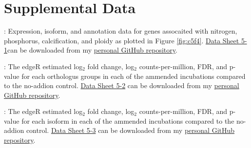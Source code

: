 \begin{landscape}
\begin{table}[h!]
\begin{tabular}{lL{1.25cm}L{2cm}L{2.5cm}L{2cm}L{2cm}L{2cm}L{3cm}L{3cm}}
\end{tabular}
\end{table}
\end{landscape}

\section{Supplemental Data}

    \begin{DS5}
\item \label{DS51}: Expression, isoform, and annotation data for genes assocaited with nitrogen, phosphorus, calcification, and ploidy as plotted in Figure \ref{fig:c5f4}. \href{https://github.com/halexand/MIT\_Latex/blob/master/SupplementalDataSheet\_Chapter5/C5\_DataSheet1\_NutrientGenes.xlsx?raw=true}{Data Sheet 5-1}can be downloaded from my \href{https://github.com/halexand/MIT\_Latex/tree/master/SupplementalDataSheet\_Chapter5}{personal GitHub repository}. 
  
    \item \label{DS52}: The edgeR estimated log$_2$ fold change, log$_2$ counts-per-million, FDR, and p-value for each orthologus groups in each of the ammended incubations compared to the no-addion control.  \href{https://github.com/halexand/MIT\_Latex/blob/master/SupplementalDataSheet\_Chapter5/C5\_DataSheet2\_AllGenes.xlsx?raw=true}{Data Sheet 5-2} can be downloaded from my \href{https://github.com/halexand/MIT\_Latex/tree/master/SupplementalDataSheet\_Chapter5}{personal GitHub repository}. 

    \item \label{DS53}: The edgeR estimated log$_2$ fold change, log$_2$ counts-per-million, FDR, and p-value for each isoform in each of the ammended incubations compared to the no-addion control. \href{https://github.com/halexand/MIT\_Latex/blob/master/SupplementalDataSheet\_Chapter5/C5\_DataSheet3\_AllIsoforms.xlsx?raw=true}{Data Sheet 5-3} can be downloaded from my \href{https://github.com/halexand/MIT\_Latex/tree/master/SupplementalDataSheet\_Chapter5}{personal GitHub repository}. 
  
    \end{DS5}





